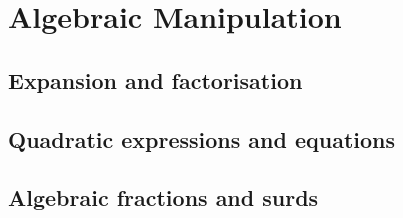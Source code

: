 
\section{Algebraic Manipulation}

\subsection{Expansion and factorisation}


\subsection{Quadratic expressions and equations}


\subsection{Algebraic fractions and surds}


